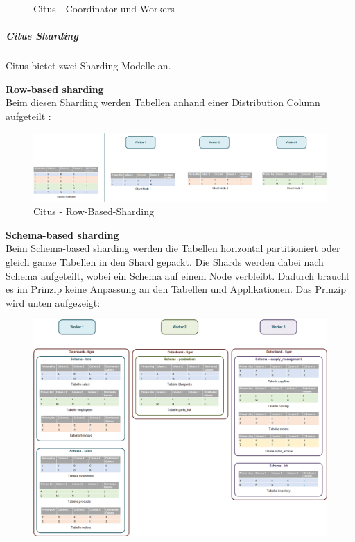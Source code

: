 \begin{flushleft}
\begin{flushleft}
\begin{figure}[H]
            \caption{Citus - Coordinator und Workers}
            \label{fig:citus_coordinator_worker}
        \end{figure}
    \end{flushleft}
    \begin{flushleft}
        \subparagraph{Citus Sharding}
        \label{subpar:citus_sharding}
        Citus bietet zwei Sharding-Modelle an.
        \begin{flushleft}
            \textbf{Row-based sharding}\\
            Beim diesen Sharding werden Tabellen anhand einer Distribution Column aufgeteilt \cite{2Y5FA36C, FDUUL9IM}:
            \begin{figure}[H]
                \centering
                \includegraphics[width=0.8\linewidth]{source/implementation/evaluation/postgresql_ha_solutions/stackgres/citus_row-based-sharding}
                \caption{Citus - Row-Based-Sharding}
                \label{fig:citus_row-based-sharding}
            \end{figure}
        \end{flushleft}
        \clearpage
        \begin{flushleft}
            \textbf{Schema-based sharding}\\
            Beim Schema-based sharding werden die Tabellen horizontal partitioniert oder gleich ganze Tabellen in den Shard gepackt.
            Die Shards werden dabei nach Schema aufgeteilt, wobei ein Schema auf einem Node verbleibt.
            Dadurch braucht es im Prinzip keine Anpassung an den Tabellen und Applikationen.
            Das Prinzip wird unten aufgezeigt:
            \begin{figure}[H]
                \centering
                \includegraphics[width=0.8\linewidth]{source/implementation/evaluation/postgresql_ha_solutions/stackgres/citus_schema-based-sharding}

\end{figure}
\end{flushleft}
\end{flushleft}
\end{flushleft}
